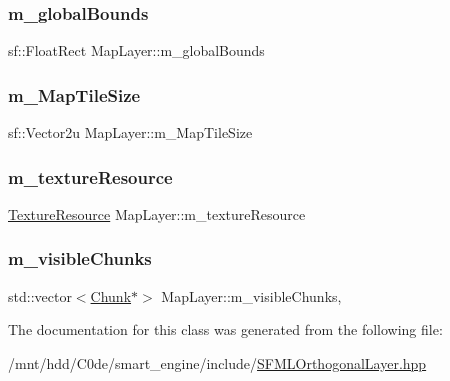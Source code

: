 \subsubsection{\texorpdfstring{m\+\_\+global\+Bounds}{m\_globalBounds}}
{\footnotesize\ttfamily sf\+::\+Float\+Rect Map\+Layer\+::m\+\_\+global\+Bounds\hspace{0.3cm}{\ttfamily [private]}}

\mbox{\label{classMapLayer_a9863689eb080d27e7a99dea7c20aee41}} 
\subsubsection{\texorpdfstring{m\+\_\+\+Map\+Tile\+Size}{m\_MapTileSize}}
{\footnotesize\ttfamily sf\+::\+Vector2u Map\+Layer\+::m\+\_\+\+Map\+Tile\+Size\hspace{0.3cm}{\ttfamily [private]}}

\mbox{\label{classMapLayer_ad7cade67df5e55b3c6a960476e6d2cb9}} 
\subsubsection{\texorpdfstring{m\+\_\+texture\+Resource}{m\_textureResource}}
{\footnotesize\ttfamily \hyperlink{classMapLayer_a64011087426e436e3cb8374570378d68}{Texture\+Resource} Map\+Layer\+::m\+\_\+texture\+Resource\hspace{0.3cm}{\ttfamily [private]}}

\mbox{\label{classMapLayer_a74941b5479affea58ea8a3068770d430}} 
\subsubsection{\texorpdfstring{m\+\_\+visible\+Chunks}{m\_visibleChunks}}
{\footnotesize\ttfamily std\+::vector$<$\hyperlink{classMapLayer_1_1Chunk}{Chunk}$\ast$$>$ Map\+Layer\+::m\+\_\+visible\+Chunks\hspace{0.3cm}{\ttfamily [mutable]}, {\ttfamily [private]}}



The documentation for this class was generated from the following file\+:\begin{DoxyCompactItemize}
\item 
/mnt/hdd/\+C0de/smart\+\_\+engine/include/\hyperlink{SFMLOrthogonalLayer_8hpp}{S\+F\+M\+L\+Orthogonal\+Layer.\+hpp}\end{DoxyCompactItemize}
